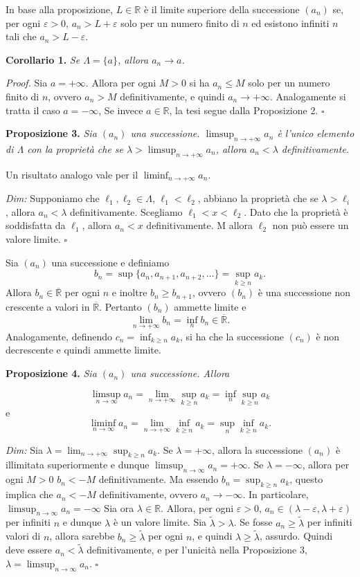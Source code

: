 \documentclass[11pt,a4paper]{article}
\newcommand{\R}{\mathbb{R}}
\newcommand{\Rbar}{\overline{\mathbb{R}}}
\newcommand{\result}[2]{\par\medskip\noindent\textbf{#1} \textit{#2}\par}
\newcommand{\proofit}{\par\medskip\noindent\textit{Dim:} }
\newcommand{\proofen}{\par\medskip\noindent\textit{Proof.} }
\newcommand{\qedherecustom}{\hfill$\square$}
\begin{document}
In base alla proposizione, $L\in\R$ è il limite superiore della successione $(a_n)$ se, per ogni $\varepsilon>0$, $a_n>L+\varepsilon$ solo per un numero finito di $n$ ed esistono infiniti $n$ tali che $a_n>L-\varepsilon$.

\result{Corollario 1.}{Se $\Lambda=\{a\}$, allora $a_n\to a$.}

\proofen Sia $a=+\infty$. Allora per ogni $M>0$ si ha $a_n\le M$ solo per un numero finito di $n$, ovvero $a_n>M$ definitivamente, e quindi $a_n\to+\infty$. Analogamente si tratta il caso $a=-\infty$, Se invece $a\in\R$, la tesi segue dalla Proposizione 2. \qedherecustom

\result{Proposizione 3.}{Sia $(a_n)$ una successione. $\limsup_{n\to+\infty}a_n$ è l'unico elemento di $\Lambda$ con la proprietà che se $\lambda>\limsup_{n\to+\infty}a_n$, allora $a_n<\lambda$ definitivamente.}

Un risultato analogo vale per il $\liminf_{n\to+\infty}a_n$.

\proofit Supponiamo che $\ell_1,\ell_2\in\Lambda$, $\ell_1<\ell_2$, abbiano la proprietà che se $\lambda>\ell_i$, allora $a_n<\lambda$ definitivamente. Scegliamo $\ell_1<x<\ell_2$. Dato che la proprietà è soddisfatta da $\ell_1$, allora $a_n<x$ definitivamente. M allora $\ell_2$ non può essere un valore limite. \qedherecustom

Sia $(a_n)$ una successione e definiamo
\[
b_n=\sup\{a_n,a_{n+1},a_{n+2},\ldots\}=\sup_{k\ge n}a_k.
\]
Allora $b_n\in\Rbar$ per ogni $n$ e inoltre $b_n\ge b_{n+1}$, ovvero $(b_n)$ è una successione non crescente a valori in $\Rbar$. Pertanto $(b_n)$ ammette limite e
\[
\lim_{n\to+\infty}b_n=\inf_n b_n\in\Rbar.
\]
Analogamente, definendo $c_n=\inf_{k\ge n}a_k$, si ha che la successione $(c_n)$ è non decrescente e quindi ammette limite.

\result{Proposizione 4.}{Sia $(a_n)$ una successione. Allora}
\[
\limsup_{n\to\infty}a_n
=\lim_{n\to+\infty}\sup_{k\ge n}a_k
=\inf_n\sup_{k\ge n}a_k
\]
e
\[
\liminf_{n\to\infty}a_n
=\lim_{n\to+\infty}\inf_{k\ge n}a_k
=\sup_n\inf_{k\ge n}a_k.
\]

\proofit Sia $\lambda=\lim_{n\to+\infty}\sup_{k\ge n}a_k$. Se $\lambda=+\infty$, allora la successione $(a_n)$ è illimitata superiormente e dunque $\limsup_{n\to\infty}a_n=+\infty$. Se $\lambda=-\infty$, allora per ogni $M>0$ $b_n<-M$ definitivamente. Ma essendo $b_n=\sup_{k\ge n}a_k$, questo implica che $a_n<-M$ definitivamente, ovvero $a_n\to-\infty$. In particolare, $\limsup_{n\to\infty}a_n=-\infty$ Sia ora $\lambda\in\R$. Allora, per ogni $\varepsilon>0$, $a_n\in(\lambda-\varepsilon,\lambda+\varepsilon)$ per infiniti $n$ e dunque $\lambda$ è un valore limite. Sia $\widetilde\lambda>\lambda$. Se fosse $a_n\ge\widetilde\lambda$ per infiniti valori di $n$, allora sarebbe $b_n\ge\widetilde\lambda$ per ogni $n$, e quindi $\lambda\ge\widetilde\lambda$, assurdo. Quindi deve essere $a_n<\widetilde\lambda$ definitivamente, e per l'unicità nella Proposizione 3, $\lambda=\limsup_{n\to\infty}a_n$. \qedherecustom
\end{document}
